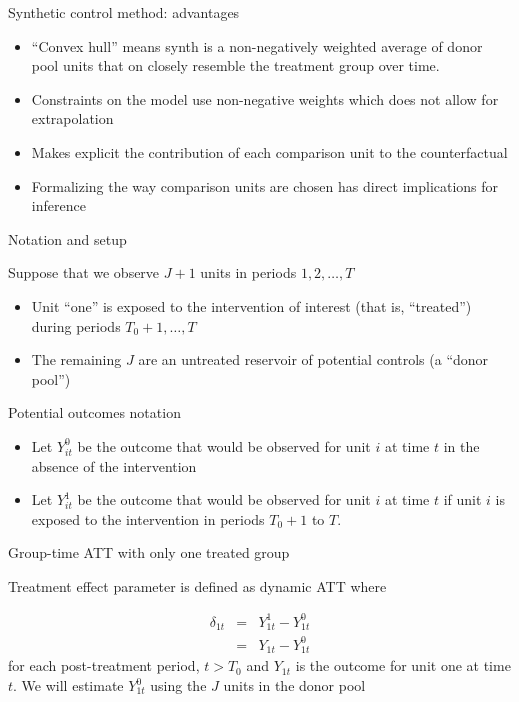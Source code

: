 \documentclass{beamer}
\begin{document}
\begin{frame}{Synthetic control method: advantages}
	
	\begin{itemize}
	\item ``Convex hull'' means synth is a non-negatively weighted average of donor pool units that on closely resemble the treatment group over time.
	\item Constraints on the model use non-negative weights which does not allow for extrapolation 
	\item Makes explicit the contribution of each comparison unit to the counterfactual 
	\item Formalizing the way comparison units are chosen has direct implications for inference
	\end{itemize}
\end{frame}




\begin{frame}{Notation and setup}
	
Suppose that we observe $J+1$ units in periods $1, 2, \dots, T$
		\begin{itemize}
		\item Unit ``one'' is exposed to the intervention of interest (that is, ``treated'') during periods $T_0+1, \dots, T$
		\item The remaining $J$ are an untreated reservoir of potential controls (a ``donor pool'')
		\end{itemize}	
\end{frame}


\begin{frame}{Potential outcomes notation}

		\begin{itemize}
		\item Let $Y_{it}^0$ be the outcome that would be observed for unit $i$ at time $t$ in the absence of the intervention
		\item Let $Y_{it}^1$ be the outcome that would be observed for unit $i$ at time $t$ if unit $i$ is exposed to the intervention in periods $T_0+1$ to $T$.
		\end{itemize}

\end{frame}

\begin{frame}{Group-time ATT with only one treated group}

Treatment effect parameter is defined as dynamic ATT where 

\begin{eqnarray*}
\delta_{1t}&=&Y_{1t}^1 - Y_{1t}^0 \\
&=& Y_{1t} - Y_{1t}^0 
\end{eqnarray*} for each post-treatment period, $t>T_0$ and $Y_{1t}$ is the outcome for unit one at time $t$. We will estimate $Y^0_{1t}$ using the $J$ units in the donor pool 

\end{frame}
\end{document}

